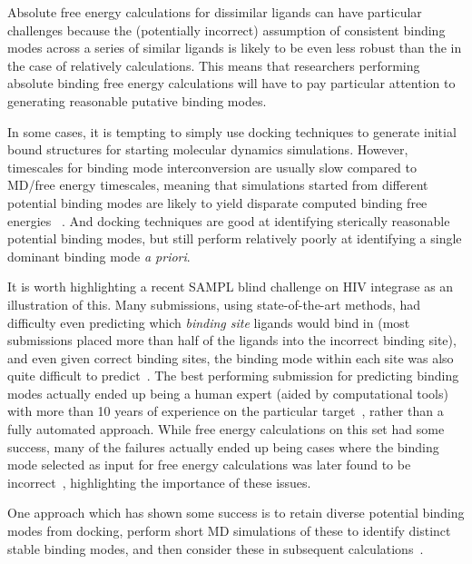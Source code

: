 \documentclass[9pt,bestpractices]{livecoms}
\begin{document}
Absolute free energy calculations for dissimilar ligands can have particular challenges because the (potentially incorrect) assumption of consistent binding modes across a series of similar ligands is likely to be even less robust than the in the case of relatively calculations.
This means that researchers performing absolute binding free energy calculations will have to pay particular attention to generating reasonable putative binding modes.

In some cases, it is tempting to simply use docking techniques to generate initial bound structures for starting molecular dynamics simulations.
However, timescales for binding mode interconversion are usually slow compared to MD/free energy timescales, meaning that simulations started from different potential binding modes are likely to yield disparate computed binding free energies~\cite{mobley2006use, palma2012computation, mobley2012perspective, gill2018binding} .
And docking techniques are good at identifying sterically reasonable potential binding modes, but still perform relatively poorly at identifying a single dominant binding mode \emph{a priori}.~\cite{} 

It is worth highlighting a recent SAMPL blind challenge on HIV integrase as an illustration of this. 
Many submissions, using state-of-the-art methods, had difficulty even predicting which \emph{binding site} ligands would bind in (most submissions placed more than half of the ligands into the incorrect binding site), and even given correct binding sites, the binding mode within each site was also quite difficult to predict~\cite{mobley2014blind}.
The best performing submission for predicting binding modes actually ended up being a human expert (aided by computational tools) with more than 10 years of experience on the particular target~\cite{voet2014combining}, rather than a fully automated approach.
While free energy calculations on this set had some success, many of the failures actually ended up being cases where the binding mode selected as input for free energy calculations was later found to be incorrect~\cite{gallicchio2014virtual}, highlighting the importance of these issues.

One approach which has shown some success is to retain diverse potential binding modes from docking, perform short MD simulations of these to identify distinct stable binding modes, and then consider these in subsequent calculations~\cite{gallicchio2014virtual, mobley2006use,rocklin2013blind, boyce2009predicting, mobley2007predicting}.
\end{document}
